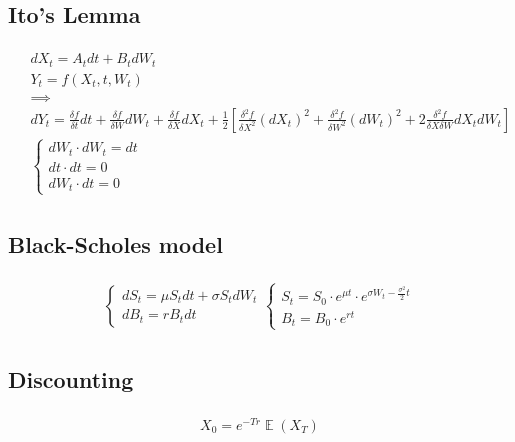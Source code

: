 \documentclass{article}
\def\Exp#1{{\operatorname{\mathbb{E}} \left({#1}\right)}}
\def\Eq#1{{\begin{gather}\begin{split} #1 \end{split}\end{gather}}}
\begin{document}
\subsection*{Ito's Lemma} 
\Eq{
    &dX_t = A_t dt + B_t dW_t \\
    &Y_t = f(X_t, t, W_t) \\
    & \implies \\
    &dY_t = \frac{\delta f}{\delta t} dt + \frac{\delta f}{\delta W}dW_t + \frac{\delta f}{\delta X}dX_t + \frac{1}{2}\left[\frac{\delta^2 f}{\delta X^2}(dX_t)^2 + \frac{\delta^2 f}{\delta W^2}(dW_t)^2 + 2\frac{\delta^2 f}{\delta X \delta W}dX_t dW_t\right]\\
    &\begin{cases}
        dW_t \cdot dW_t = dt\\
        dt \cdot dt = 0\\
        dW_t \cdot dt = 0
    \end{cases}
}
\begin{multicols}{2}
\subsection*{Black-Scholes model}
\Eq{
    \begin{cases}
    dS_t = \mu S_t dt + \sigma S_t dW_t \\
    dB_t = rB_t dt
    \end{cases}
    \begin{cases}
    S_t = S_0 \cdot e^{\mu t} \cdot e^{\sigma W_t - \frac{\sigma^2}{2}t} \\
    B_t = B_0 \cdot e ^ {r t}
    \end{cases}
}

    \subsection*{Discounting}
\Eq{
X_0 = e^{-T r}\Exp{X_T}
}
\end{multicols}
\end{document}
